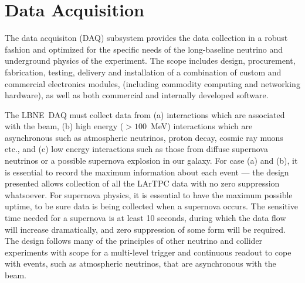 

\newcommand{\LBNE}{LBNE}
\newcommand{\COMPARTMENT}{detector section}
\newcommand{\COMPARTMENTS}{detector sections}

\chapter{Data Acquisition}
\label{ch:trig}

The data acquisiton (DAQ) subsystem provides the data collection
in a robust fashion and optimized for the specific needs of the long-baseline neutrino and
underground physics of the experiment.  The scope includes design,
procurement, fabrication, testing, delivery and installation of a
combination of custom and commercial electronics modules, (including
commodity computing and networking hardware), as well as both
commercial and internally developed software.


The \LBNE\ DAQ must collect data from (a) interactions which are
associated with the beam, (b) high energy ($>100$~MeV) interactions
which are asynchronous such as atmospheric neutrinos, proton decay,
cosmic ray muons etc., and (c) low energy interactions such as those
from diffuse supernova neutrinos or a possible supernova explosion in
our galaxy.  For case (a) and (b), it is essential to record the
maximum information about each event --- the design presented
allows collection of all the LArTPC data with no zero suppression
whatsoever.  For supernova physics, it is essential to have the
maximum possible uptime, to be sure data is being collected when a
supernova occurs.
The sensitive time needed for a supernova is at least 10 seconds,
during which the data flow will increase dramatically, and zero
suppression of some form will be required.  The design follows many of
the principles of other neutrino and collider experiments with scope
for a multi-level trigger and continuous readout to cope with events,
such as atmospheric neutrinos, that are asynchronous with the beam.

